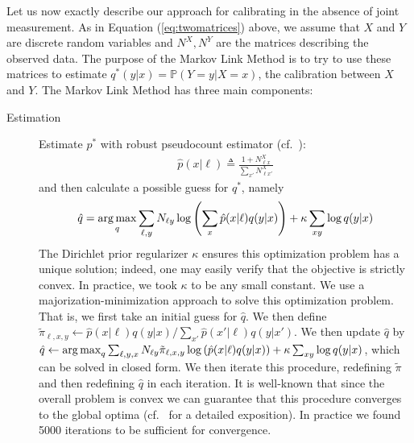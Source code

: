 Let us now exactly describe our approach for calibrating in the absence of joint measurement.  As in Equation (\ref{eq:twomatrices}) above, we assume that $X$ and $Y$ are discrete random variables and $N^X,N^Y$ are the matrices describing the  observed data. The purpose of the Markov Link Method is to try to use these matrices to estimate $q^*(y|x)=\mathbb{P}(Y=y|X=x)$, the calibration between $X$ and $Y$.  The Markov Link Method has three main components:

\begin{description}
\item[Estimation]  Estimate $p^*$ with robust pseudocount estimator (cf.\ \cite{flach2012machine}):
\begin{align}
\hat p(x|\ell) \triangleq \frac{1+N^X_{\ell x}}{\sum_{x'} N^X_{\ell x'}} \label{eq:pseudocountp}
\end{align}
and then calculate a possible guess for $q^*$, namely
\begin{align}
\hat q = \operatorname*{arg\,max}_q \sum_{\ell,y}N_{\ell y}\log\left(\sum_{x}\hat p(x|\ell)q(y|x)\right) + \kappa \sum_{xy} \log q(y|x)
\label{eq:mlmq}
\end{align}
The Dirichlet prior regularizer $\kappa$ ensures this optimization problem has a unique solution; indeed, one may easily verify that the objective is strictly convex. In practice, we took $\kappa$ to be any small constant.    We use a majorization-minimization approach to solve this optimization problem.  That is, we first take an initial guess for $\hat q$.  We then define $\tilde \pi_{\ell,x,y} \gets \hat p(x|\ell)q(y|x) / \sum_{x'} \hat p(x'|\ell)q(y|x')$.  We then update $\hat q$ by  $\hat q \gets \operatorname*{arg\,max}_q \sum_{\ell,y,x}N_{\ell y}\tilde \pi_{\ell,x,y}\log\left(\hat p(x|\ell)q(y|x)\right) + \kappa \sum_{xy} \log q(y|x)$, which can be solved in closed form.  We then iterate this procedure, redefining $\tilde \pi$ and then redefining $\hat q$ in each iteration.  It is well-known that since the overall problem is convex we can guarantee that this procedure converges to the global optima (cf.\ \cite{wu1983convergence} for a detailed exposition).  In practice we found 5000 iterations to be sufficient for convergence.  


\end{description}
